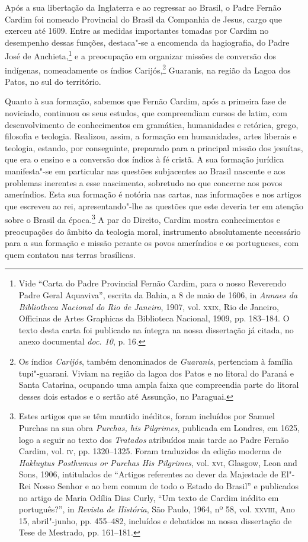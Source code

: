 Após a sua libertação da Inglaterra e ao regressar ao Brasil, o Padre
Fernão Cardim foi nomeado Provincial do Brasil da Companhia de Jesus,
cargo que exerceu até 1609. Entre as medidas importantes tomadas por
Cardim no desempenho dessas funções, destaca"-se a encomenda da
hagiografia, do Padre José de Anchieta,\footnote{ Vide
``Carta do Padre Provincial Fernão Cardim, para o nosso
Reverendo Padre Geral Aquaviva'', escrita da Bahia, a 8 de maio de
1606, in \textit{Annaes da Bibliotheca Nacional do Rio de Janeiro}, 
1907, vol. \textsc{xxix}, Rio de Janeiro, Officinas de Artes Graphicas da
Biblioteca Nacional, 1909, pp. 183--184. O texto desta carta foi
publicado na íntegra na nossa dissertação já citada, no anexo
documental \textit{doc. 10}, p. 16.} e a preocupação em organizar
missões de conversão dos indígenas, nomeadamente os índios
Carijós,\footnote{ Os índios \textit{Carijós}, também denominados
de \textit{Guaranis}, pertenciam à família tupi"-guarani. Viviam na
região da lagoa dos Patos e no litoral do Paraná e Santa Catarina,
ocupando uma ampla faixa que compreendia parte do litoral desses dois
estados e o sertão até Assunção, no Paraguai.} Guaranis, na região da
Lagoa dos Patos, no sul do território.

Quanto à sua formação, sabemos que Fernão Cardim, após a primeira
fase de noviciado, continuou os seus estudos, que compreendiam cursos
de latim, com desenvolvimento de conhecimentos em gramática,
humanidades e retórica, grego, filosofia e teologia. Realizou, assim, a
formação em humanidades, artes liberais e teologia, estando, por
conseguinte, preparado para a principal missão dos jesuítas, que era o
ensino e a conversão dos índios à fé cristã. A sua formação jurídica
manifesta"-se em particular nas questões subjacentes ao Brasil
nascente e aos problemas inerentes a esse nascimento, sobretudo no que
concerne aos povos ameríndios. Esta sua formação é notória nas cartas,
nas informações e nos artigos que escreveu ao rei,
apresentando"-lhe as questões que este deveria ter em atenção sobre o
Brasil da época.\footnote{ Estes artigos que se têm mantido
inéditos, foram incluídos por Samuel Purchas na sua obra
\textit{Purchas, his Pilgrimes}, publicada em Londres, em 1625, logo a
seguir ao texto dos \textit{Tratados} atribuídos mais tarde ao Padre
Fernão Cardim, vol. \textsc{iv}, pp. 1320--1325. Foram traduzidos da edição
moderna de \textit{Hakluytus Posthumus or Purchas His Pilgrimes}, vol. \textsc{xvi}, 
Glasgow, Leon and Sons, 1906, intitulados de ``Artigos referentes
ao dever da Majestade de El"-Rei Nosso Senhor e ao bem comum de todo o
Estado do Brasil'' e publicados no artigo de Maria Odília Dias Curly,
``Um texto de Cardim inédito em português?'', in \textit{Revista de
História}, São Paulo, 1964, nº 58, vol. \textsc{xxviii}, Ano 15, abril"-junho,
pp. 455--482, incluídos e debatidos na nossa dissertação de Tese de
Mestrado, pp. 161--181.} A par do Direito, Cardim mostra conhecimentos e
preocupações do âmbito da teologia moral, instrumento absolutamente
necessário para a sua formação e missão perante os povos ameríndios e
os portugueses, com quem contatou nas terras brasílicas.


